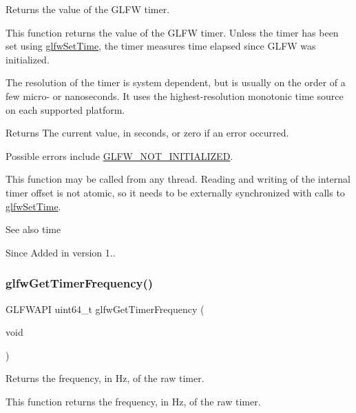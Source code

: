 Returns the value of the G\+L\+FW timer. 

This function returns the value of the G\+L\+FW timer. Unless the timer has been set using \hyperlink{group__input_ga94360a3628a09f32708f83cc3fa48590}{glfw\+Set\+Time}, the timer measures time elapsed since G\+L\+FW was initialized.

The resolution of the timer is system dependent, but is usually on the order of a few micro-\/ or nanoseconds. It uses the highest-\/resolution monotonic time source on each supported platform.

\begin{DoxyReturn}{Returns}
The current value, in seconds, or zero if an error occurred.
\end{DoxyReturn}
Possible errors include \hyperlink{group__errors_ga2374ee02c177f12e1fa76ff3ed15e14a}{G\+L\+F\+W\+\_\+\+N\+O\+T\+\_\+\+I\+N\+I\+T\+I\+A\+L\+I\+Z\+ED}.

This function may be called from any thread. Reading and writing of the internal timer offset is not atomic, so it needs to be externally synchronized with calls to \hyperlink{group__input_ga94360a3628a09f32708f83cc3fa48590}{glfw\+Set\+Time}.

\begin{DoxySeeAlso}{See also}
time
\end{DoxySeeAlso}
\begin{DoxySince}{Since}
Added in version 1.. 
\end{DoxySince}
\mbox{\label{group__input_gaa92d10b10013372778efbf6367714371}} 
\subsubsection{\texorpdfstring{glfw\+Get\+Timer\+Frequency()}{glfwGetTimerFrequency()}}
{\footnotesize\ttfamily G\+L\+F\+W\+A\+PI uint64\+\_\+t glfw\+Get\+Timer\+Frequency (\begin{DoxyParamCaption}\item[{void}]{ }\end{DoxyParamCaption})}



Returns the frequency, in Hz, of the raw timer. 

This function returns the frequency, in Hz, of the raw timer.

